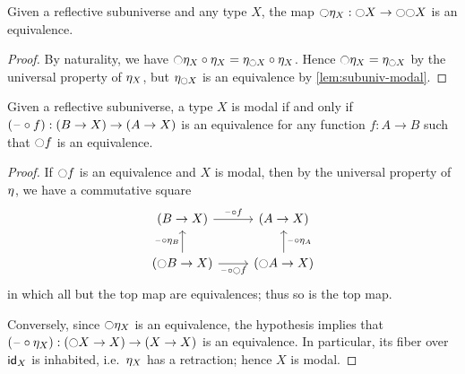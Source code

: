 \begin{lem}
  Given a reflective subuniverse and any type $X$, the map $\modal \modalunit[X] : \modal X \to \modal\modal X$ is an equivalence.
\end{lem}
\begin{proof}
  By naturality, we have $\modal \modalunit[X] \circ \modalunit[X] = \modalunit[\modal X] \circ \modalunit[X]$.
  Hence $\modal \modalunit[X] = \modalunit[\modal X]$ by the universal property of $\modalunit[X]$, but $\modalunit[\modal X]$ is an equivalence by \cref{lem:subuniv-modal}.
\end{proof}

\begin{lem}\label{thm:rsu-galois}
  Given a reflective subuniverse, a type $X$ is modal if and only if $(\blank \circ f) : (B\to X) \to (A\to X)$ is an equivalence for any function $f:A\to B$ such that $\modal f$ is an equivalence.
\end{lem}
\begin{proof}
  If $\modal f$ is an equivalence and $X$ is modal, then by the universal property of $\modalunit$, we have a commutative square
  \[
  \begin{tikzcd}
    (B\to X) \ar[r,"\blank\circ f"] & (A\to X) \\
    (\modal B\to X) \ar[r,"\blank\circ\modal f"'] \ar[u,"{\blank\circ \modalunit[B]}"] &
    (\modal A \to X) \ar[u,"{\blank\circ \modalunit[A]}"']
  \end{tikzcd}
  \]
  in which all but the top map are equivalences; thus so is the top map.

  Conversely, since $\modal\modalunit[X]$ is an equivalence, the hypothesis implies that
  $(\blank \circ \modalunit[X]) : (\modal X\to X) \to (X\to X)$
  is an equivalence.
  In particular, its fiber over $\idfunc[X]$ is inhabited, i.e.\ $\modalunit[X]$ has a retraction; hence $X$ is modal.
\end{proof}


